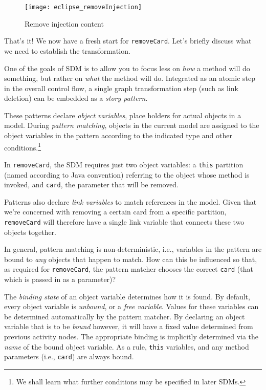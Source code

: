 \newpage

\begin{figure}[htbp]
	\centering
    \texttt{[image: eclipse\_removeInjection]}
	\caption{Remove injection content}
	\label{eclipse:delete_injection}
\end{figure}

\vspace{1cm}

That's it! We now have a fresh start for \texttt{removeCard}. Let's briefly discuss what we need to establish the transformation.

One of the goals of SDM is to allow you to focus less on \emph{how} a method will do something, but rather on \emph{what} the method will do.
Integrated as an atomic step in the overall control flow, a single graph transformation step (such as link deletion) can be embedded as a
\emph{story pattern}.

These patterns declare \emph{object variables}, place holders for actual objects in a model. During \emph{pattern matching}, objects
in the current model are assigned to the object variables in the pattern according to the indicated type and other conditions.\footnote{We shall learn what
further conditions may be specified in later SDMs.}

\clearpage

In \texttt{removeCard}, the SDM requires just two object variables: a \texttt{this} partition (named according to Java convention) referring to the
object whose method is invoked, and \texttt{card}, the parameter that will be removed.

Patterns also declare \emph{link variables} to match references in the model. Given that
we're concerned with removing a certain card from a specific partition, \texttt{removeCard} will therefore have a single link variable that connects these two
objects together.

In general, pattern matching is non-deterministic, i.e., variables in the pattern are bound to \emph{any} objects that happen to match. How can this
be influenced so that, as required for \texttt{removeCard}, the pattern matcher chooses the correct \texttt{card} (that which is passed in as a parameter)?

The \emph{binding state} of an object variable determines how it is found. By default, every object variable is \emph{unbound}, or a 
\emph{free variable}. Values for these variables can be determined automatically by the pattern matcher. By declaring an
object variable that is to be \emph{bound} however, it will have a fixed value determined from previous activity nodes. The appropriate binding is
implicitly determined via the \emph{name} of the bound object variable. As a rule, \texttt{this} variables, and any method parameters (i.e., \texttt{card}) are
always bound.

